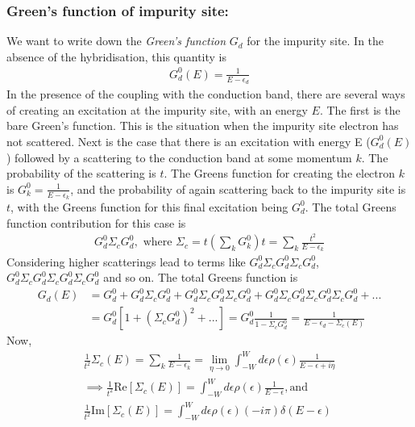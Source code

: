 \documentclass[twoside,11pt]{report}
\numberwithin{equation}{section}
\begin{document}
\subsubsection{Green's function of impurity site:}
We want to write down the \textit{Green's function} \(G_d\) for the impurity site.
In the absence of the hybridisation, this quantity is
\begin{equation}\begin{aligned}
G^0_d(E) = \frac{1}{E - \epsilon_d}
\end{aligned}\end{equation}
In the presence of the coupling with the conduction band, there are several ways of creating an excitation at the impurity site, with an energy \(E\).
The first is the bare Green's function.
This is the situation when the impurity site electron has not scattered.
Next is the case that there is an excitation with energy E (\(G^0_d(E)\)) followed by a scattering to the conduction band at some momentum \(k\).
The probability of the scattering is \(t\).
The Greens function for creating the electron \(k\) is \(G^0_k = \frac{1}{E-\epsilon_k}\), and the probability of again scattering back to the impurity site is \(t\), with the Greens function for this final excitation being \(G^0_d\).
The total Greens function contribution for this case is
\begin{equation}\begin{aligned}
	G^0_d \Sigma_c G^0_d, \text{  where  }\Sigma_c = t \left(\sum_k G^0_k\right) t = \sum_k \frac{t^2}{E - \epsilon_k}
\end{aligned}\end{equation}
Considering higher scatterings lead to terms like \(G^0_d \Sigma_c G^0_d\Sigma_c G^0_d\),\\\(G^0_d \Sigma_c G^0_d\Sigma_c G^0_d\Sigma_c G^0_d\) and so on.
The total Greens function is
\begin{equation}\begin{aligned}
G_d(E) &= G^0_d + G^0_d \Sigma_c G^0_d + G^0_d \Sigma_c G^0_d\Sigma_c G^0_d + G^0_d \Sigma_c G^0_d\Sigma_c G^0_d\Sigma_c G^0_d + ...
\\
       &= G^0_d\left[1+\left(\Sigma_c G^0_d\right)^2+...\right] = G^0_d \frac{1}{1-\Sigma_c G^0_d} = \frac{1}{E - \epsilon_d - \Sigma_c(E)} 
\end{aligned}\end{equation}
Now,
\begin{gather}
\frac{1}{t^2}\Sigma_c(E) = \sum_k \frac{1}{E - \epsilon_k} = \lim_{\eta \rightarrow 0}\int_{-W}^W d\epsilon \rho(\epsilon) \frac{1}{E - \epsilon + i\eta}\\
\implies \frac{1}{t^2}\text{Re} \left[\Sigma_c(E)\right] = \int_{-W}^W d\epsilon \rho(\epsilon)\frac{1}{E - \epsilon}, \text{and }\\
\frac{1}{t^2}\text{Im} \left[\Sigma_c(E)\right] = \int_{-W}^W d\epsilon \rho(\epsilon) (-i\pi)\delta(E-\epsilon)
\end{gather}
\end{document}
